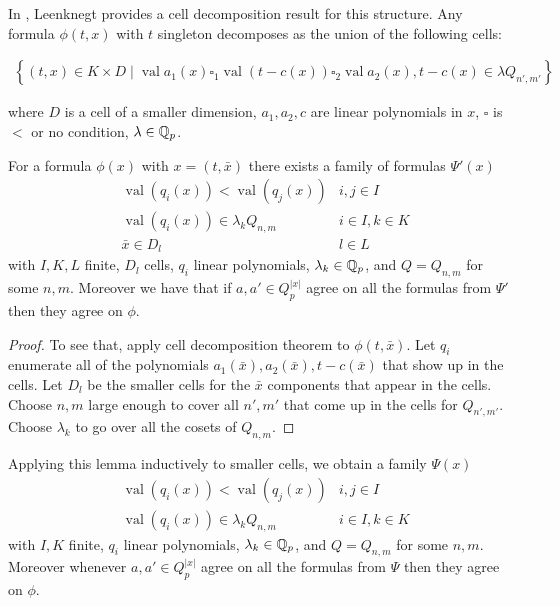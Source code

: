 \documentclass{amsart}
\newcommand{\curly}[1]{\left\{#1\right\}}
\newcommand{\paren}[1]{\left(#1\right)}
\DeclareMathOperator{\val}{val}
\begin{document}
In \cite{reduct}, Leenknegt provides a cell decomposition result for this structure.
Any formula $\phi(t, x)$  with $t$  singleton decomposes as the union of the following cells:

\begin{align*}
	\curly{(t, x) \in K \times D \mid \val a_1(x) \square_1 \val (t - c(x)) \square_2 \val a_2(x), t - c(x) \in \lambda Q_{n',m'} }
\end{align*}

where $D$ is a cell of a smaller dimension, $a_1, a_2, c$ are linear polynomials in  $x$, $\square$ is $<$ or no condition, $\lambda  \in\mathbb{Q}_p$.

\begin{Lemma}
	For a formula $\phi(x)$ with $x = (t, \bar x)$ there exists a family of formulas $\Psi'(x)$
	\begin{align*}
		&\val \paren{q_i(x)} < \val \paren{q_j(x)} & i, j \in I \\
		&\val \paren{q_i(x)} \in \lambda_k Q_{n,m} & i \in I , k \in K \\
		&\bar x \in D_l & l \in L
	\end{align*}
	with $I, K, L$ finite,
	$D_l$ cells,
	$q_i$ linear polynomials,
	$\lambda_k \in \mathbb{Q}_p$, and
	$Q = Q_{n,m}$ for some $n,m$.
	Moreover we have that if $a, a' \in Q_p^{|x|}$ agree on all the formulas from $\Psi'$ then they agree on $\phi$.
\end{Lemma}

\begin{proof}
	To see that, apply cell decomposition theorem to $\phi(t, \bar x)$.
	Let $q_i$ enumerate all of the polynomials $a_1(\bar x), a_2(\bar x), t - c(\bar x)$ that show up in the cells.
	Let $D_l$ be the smaller cells for the $\bar x$ components that appear in the cells.
	Choose $n,m$ large enough to cover all $n', m'$ that come up in the cells for $Q_{n',m'}$.
	Choose $\lambda_k$ to go over all the cosets of $Q_{n,m}$.
\end{proof}

Applying this lemma inductively to smaller cells, we obtain a family $\Psi(x)$
\begin{align*}
		&\val \paren{q_i(x)} < \val \paren{q_j(x)} & i, j \in I \\
		&\val \paren{q_i(x)} \in \lambda_k Q_{n,m} & i \in I , k \in K
\end{align*}
with $I, K$ finite,
$q_i$ linear polynomials,
$\lambda_k \in \mathbb{Q}_p$, and
$Q = Q_{n,m}$ for some $n,m$.
Moreover whenever $a, a' \in Q_p^{|x|}$ agree on all the formulas from $\Psi$ then they agree on $\phi$.
\end{document}
